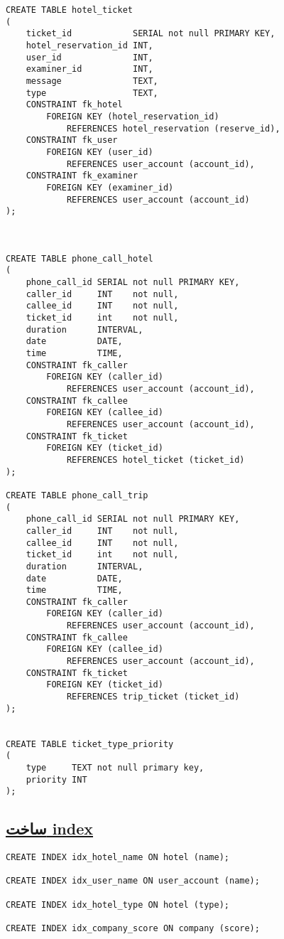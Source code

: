 \begin{lstlisting}
CREATE TABLE hotel_ticket
(
	ticket_id            SERIAL not null PRIMARY KEY,
	hotel_reservation_id INT,
	user_id              INT,
	examiner_id          INT,
	message              TEXT,
	type                 TEXT,
	CONSTRAINT fk_hotel
		FOREIGN KEY (hotel_reservation_id)
			REFERENCES hotel_reservation (reserve_id),
	CONSTRAINT fk_user
		FOREIGN KEY (user_id)
			REFERENCES user_account (account_id),
	CONSTRAINT fk_examiner
		FOREIGN KEY (examiner_id)
			REFERENCES user_account (account_id)
);



CREATE TABLE phone_call_hotel
(
	phone_call_id SERIAL not null PRIMARY KEY,
	caller_id     INT    not null,
	callee_id     INT    not null,
	ticket_id     int    not null,
	duration      INTERVAL,
	date          DATE,
	time          TIME,
	CONSTRAINT fk_caller
		FOREIGN KEY (caller_id)
			REFERENCES user_account (account_id),
	CONSTRAINT fk_callee
		FOREIGN KEY (callee_id)
			REFERENCES user_account (account_id),
	CONSTRAINT fk_ticket
		FOREIGN KEY (ticket_id)
			REFERENCES hotel_ticket (ticket_id)
);

CREATE TABLE phone_call_trip
(
	phone_call_id SERIAL not null PRIMARY KEY,
	caller_id     INT    not null,
	callee_id     INT    not null,
	ticket_id     int    not null,
	duration      INTERVAL,
	date          DATE,
	time          TIME,
	CONSTRAINT fk_caller
		FOREIGN KEY (caller_id)
			REFERENCES user_account (account_id),
	CONSTRAINT fk_callee
		FOREIGN KEY (callee_id)
			REFERENCES user_account (account_id),
	CONSTRAINT fk_ticket
		FOREIGN KEY (ticket_id)
			REFERENCES trip_ticket (ticket_id)
);


CREATE TABLE ticket_type_priority
(
	type     TEXT not null primary key,
	priority INT
);
\end{lstlisting}
\setRTL
 
\pagebreak
 
\subsection*{\underline{ساخت index}}

\setLTR
\begin{lstlisting}
CREATE INDEX idx_hotel_name ON hotel (name);

CREATE INDEX idx_user_name ON user_account (name);

CREATE INDEX idx_hotel_type ON hotel (type);

CREATE INDEX idx_company_score ON company (score);
\end{lstlisting}
\setRTL

